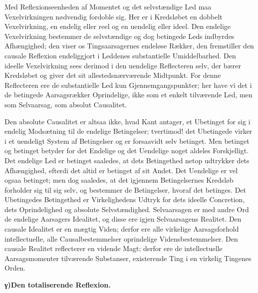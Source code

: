 \documentclass[12pt]{book}
\newcommand{\opage}[1]{\marginnote{\footnotesize\textit{[#1]}}}
\begin{document}
Med Reflexionseenheden af Momentet og det selvstændige Led maa Vexelvirkningen nødvendig
fordoble sig. Her er i Kredsløbet en dobbelt Vexelvirkning, en endelig eller reel og en
uendelig eller ideel. Den endelige Vexelvirkning bestemmer de selvstændige og dog
betingede Leds indbyrdes Afhængighed; den viser os Tingsaarsagernes endeløse Rækker, den
fremstiller den causale Reflexion endeliggjort i Leddenes substantielle Umiddelbarhed.
Den ideelle Vexelvirkning sees derimod i den uendelige Reflecteren selv, der bærer
Kredsløbet og giver det sit allestedsnærværende Midtpunkt. For denne Reflecteren ere de
substantielle Led kun Gjennemgangspunkter; her have vi det i de betingede Aarsagsrækker
Oprindelige, ikke som et enkelt tilværende Led, men som Selvaarsag, som absolut
Causalitet.

Den absolute Causalitet er altsaa ikke, hvad Kant antager, et Ubetinget for sig i endelig
Modsætning til de endelige Betingelser; tvertimod! det Ubetingede virker i et uendeligt
System af Betingelser og er forsaavidt selv betinget. Men betinget og betinget betyder
for det Endelige og det Uendelige noget aldeles Forskjelligt. Det endelige Led er
betinget saaledes, at dets Betingethed netop udtrykker dets
\opage{123} Afhængighed, efterdi det altid er betinget af sit Andet. Det Uendelige er vel ogsaa
betinget; men dog saaledes, at det igjennem Betingelsernes Kredsløb forholder sig til sig
selv, og bestemmer de Betingelser, hvoraf det betinges. Det Ubetingedes Betingethed er
Virkelighedens Udtryk for dets ideelle Concretion, dets Oprindelighed og absolute
Selvstændighed. Selvaarsagen er med andre Ord de endelige Aarsagers Idealitet, og disse
ere igjen Selvaarsagens Realitet. Den causale Idealitet er en mægtig Viden; derfor ere
alle virkelige Aarsagsforhold intellectuelle, alle Causalbestemmelser oprindelige
Vidensbestemmelser. Den causale Realitet reflecterer en vidende Magt; derfor ere de
intellectuelle Aarsagsmomenter tilværende Substanser, existerende Ting i en virkelig
Tingenes Orden.

\begin{center}{\bfseries γ)\quad Den totaliserende Reflexion.}\end{center}
\end{document}
